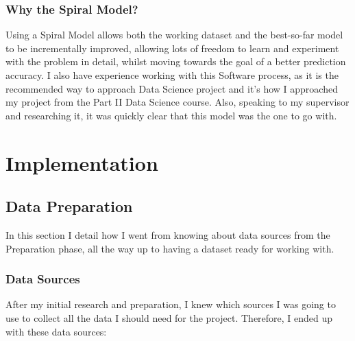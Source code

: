 \documentclass[12pt,a4paper,twoside,openright]{report}
\begin{document}
\subsection{Why the Spiral Model?}

Using a Spiral Model allows both the working dataset and the best-so-far model to be incrementally improved, allowing lots of freedom to learn and experiment with the problem in detail, whilst moving towards the goal of a better prediction accuracy. I also have experience working with this Software process, as it is the recommended way to approach Data Science project and it's how I approached my project from the Part II Data Science course. Also, speaking to my supervisor and researching it, it was quickly clear that this model was the one to go with.

\chapter{Implementation}

\section{Data Preparation}

In this section I detail how I went from knowing about data sources from the Preparation phase, all the way up to having a dataset ready for working with.

\subsection{Data Sources}

After my initial research and preparation, I knew which sources I was going to use to collect all the data I should need for the project. Therefore, I ended up with these data sources:
\end{document}
